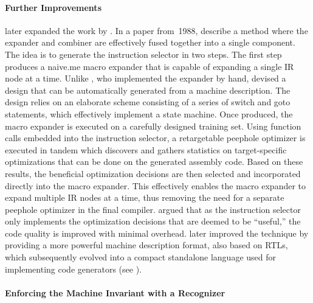 \paragraph{Further Improvements}

\textcite{FraserWendt:1988} later expanded the work by
\citeauthor{DavidsonFraser:1984}.
%
In a paper from~1988, \citeauthor{FraserWendt:1988} describe a method where the
\gls{expander} and \gls{combiner} are effectively fused together into a single
component.
%
The idea is to generate the \gls{instruction selector} in two steps.
%
The first step produces a \gls{naive.me} \gls{macro expander} that is capable of
expanding a single \gls{IR} \gls{node} at a time.
%
Unlike \citeauthor{DavidsonFraser:1984}, who implemented the \gls{expander} by
hand, \citeauthor{FraserWendt:1988} devised a design that can be automatically
generated from a \gls{machine description}.
%
The design relies on an elaborate scheme consisting of a series of switch and
goto statements, which effectively implement a \gls{state machine}.
%
Once produced, the \gls{macro expander} is executed on a carefully designed
training set.
%
Using function calls embedded into the \gls{instruction selector}, a
retargetable \gls{peephole optimizer} is executed in tandem which discovers and
gathers statistics on target-specific optimizations that can be done on the
generated \gls{assembly code}.
%
Based on these results, the beneficial optimization decisions are then selected
and incorporated directly into the \gls{macro expander}.
%
This effectively enables the \gls{macro expander} to expand multiple \gls{IR}
\glspl{node} at a time, thus removing the need for a separate \gls{peephole
  optimizer} in the final \gls{compiler}.
%
\citeauthor{FraserWendt:1988} argued that as the \gls{instruction selector} only
implements the optimization decisions that are deemed to be ``useful,'' the code
quality is improved with minimal overhead.
%
\textcite{Wendt:1990} later improved the technique by providing a more powerful
\gls{machine description} format, also based on \glspl{RTL}, which subsequently
evolved into a compact standalone language used for implementing \glspl{code
  generator} (see \textcite{Fraser:1989}).


\paragraph{Enforcing the Machine Invariant with a Recognizer}

